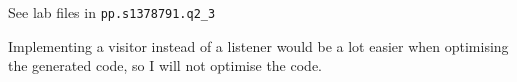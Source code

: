 See lab files in \texttt{pp.s1378791.q2\_3}

Implementing a visitor instead of a listener would be a lot easier when optimising the generated code, so I will not
optimise the code.